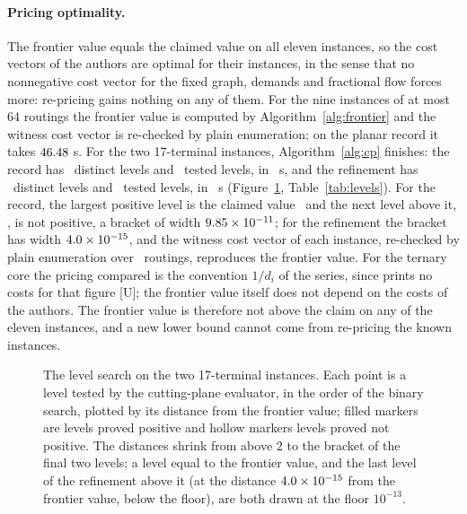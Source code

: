 \documentclass[11pt]{article}
\theoremstyle{remark}
\begin{document}
\paragraph{Pricing optimality.} The frontier value equals the claimed value on all eleven instances, so the cost vectors of the authors are optimal for their instances, in the sense that no nonnegative cost vector for the fixed graph, demands and fractional flow forces more: re-pricing gains nothing on any of them. For the nine instances of at most 64 routings the frontier value is computed by Algorithm~\ref{alg:frontier} and the witness cost vector is re-checked by plain enumeration; on the planar record it takes $46.48$ s. For the two 17-terminal instances, Algorithm~\ref{alg:cp} finishes: the record has \nkreclevels\ distinct levels and \nkrectested\ tested levels,
in \nkrecsec\ s, and the refinement has \nkreflevels\ distinct levels and \nkreftested\ tested levels, in \nkrefsec\ s (Figure~\ref{fig:levels}, Table~\ref{tab:levels}). For the record, the largest positive level is the claimed value \nkreclow\ and the next level above it, \nkrecup, is not positive, a bracket of width $9.85\times10^{-11}$; for the refinement the bracket has width $4.0\times10^{-15}$, and the witness cost vector of each instance, re-checked by plain enumeration over \nkroutings\ routings, reproduces the frontier value.
For the ternary core the pricing compared is the convention $1/d_i$ of the series, since \cite{Nik3} prints no costs for that figure [U]; the frontier value itself does not depend on the costs of the authors. The frontier value is therefore not above the claim on any of the eleven instances, and a new lower bound cannot come from re-pricing the known instances.

\begin{figure}[t]
\centering

\caption{The level search on the two 17-terminal instances. Each point is a level tested by the cutting-plane evaluator, in the order of the binary search, plotted by its distance from the frontier value; filled markers are levels proved positive and hollow markers levels proved not positive. The distances shrink from above $2$ to the bracket of the final two levels; a level equal to the frontier value, and the last level of the refinement above it (at the distance $4.0\times10^{-15}$ from the frontier value, below the floor), are both drawn at the floor $10^{-13}$.}
\label{fig:levels}
\end{figure}


\end{document}
